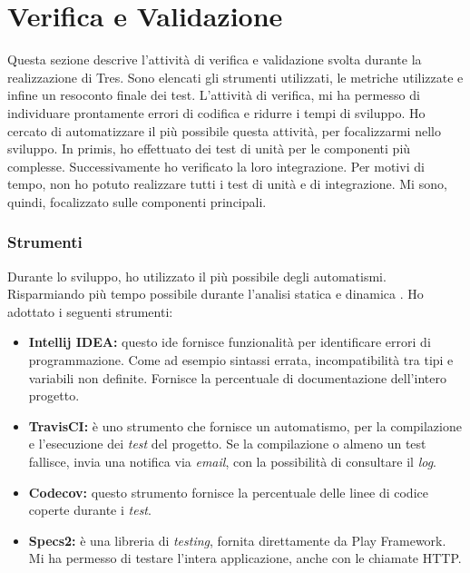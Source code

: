 \section{Verifica e Validazione}%
Questa sezione descrive l'attività di verifica e validazione svolta durante la realizzazione di Tres. Sono elencati gli strumenti utilizzati, le metriche utilizzate e infine un resoconto finale dei test. L'attività di verifica, mi ha permesso di individuare prontamente errori di codifica e ridurre i tempi di sviluppo. Ho cercato di automatizzare il più possibile questa attività, per focalizzarmi nello sviluppo. In primis, ho effettuato dei test di unità per le componenti più complesse. Successivamente ho verificato la loro integrazione. Per motivi di tempo, non ho potuto realizzare tutti i test di unità e di integrazione. Mi sono, quindi, focalizzato sulle componenti principali. 
\subsubsection{Strumenti}
Durante lo sviluppo, ho utilizzato il più possibile degli automatismi. Risparmiando più tempo possibile durante l'analisi statica e dinamica . Ho adottato i seguenti strumenti:
\begin{itemize}
\item \textbf{Intellij IDEA:} questo \gls{ide} fornisce funzionalità per identificare errori di programmazione. Come ad esempio sintassi errata, incompatibilità tra tipi e variabili non definite. Fornisce la percentuale di documentazione dell'intero progetto.
\item \textbf{TravisCI:} è uno strumento che fornisce un automatismo, per la compilazione e l'esecuzione dei \emph{test} del progetto. Se la compilazione o almeno un test fallisce, invia una notifica via \emph{email}, con la possibilità di consultare il \emph{log}.
\item \textbf{Codecov:} questo strumento fornisce la percentuale delle linee di codice coperte durante i \emph{test}.
\item \textbf{Specs2:} è una libreria di \emph{testing}, fornita direttamente da Play Framework. Mi ha permesso di testare l'intera applicazione, anche con le chiamate HTTP.
\end{itemize}
\newpage
